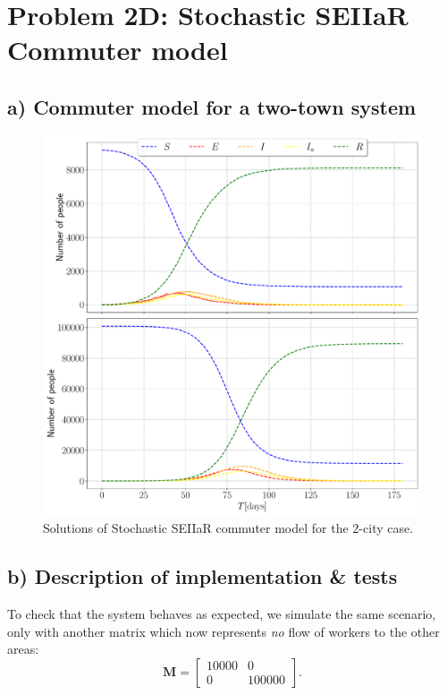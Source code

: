 \section{Problem 2D: Stochastic SEIIaR Commuter model}

\subsection{a) Commuter model for a two-town system}

\begin{figure}[htb]
	\centering
	\includegraphics[width=0.8\columnwidth]{../fig/2Da_commuter.pdf}
	\caption{Solutions of Stochastic SEIIaR commuter model for the $2$-city case.}
	\label{fig:commuter_2city}
\end{figure}

\subsection{b) Description of implementation \& tests} 


To check that the system behaves as expected, we simulate the same scenario, only with another matrix which now represents \textit{no} flow of workers to the other areas:
\begin{equation}\label{eq:test_matrix}
	\mathbf{M} = \begin{bmatrix}
		10000 & 0 \\
		0 & 100000 
	\end{bmatrix}.
\end{equation}

